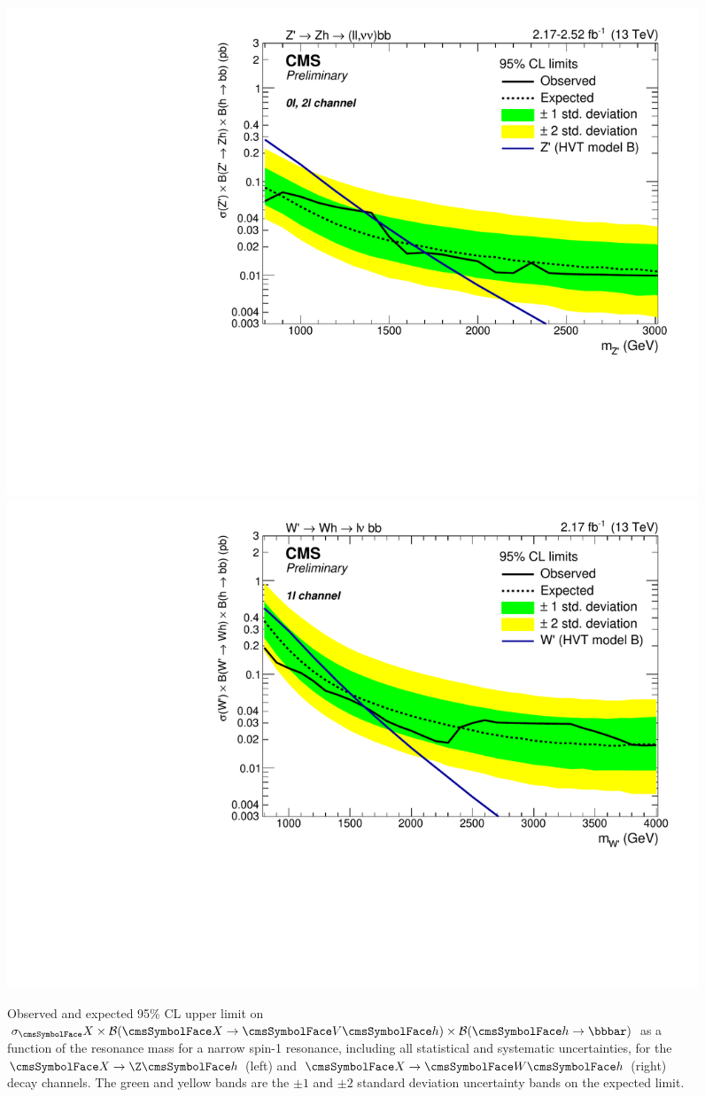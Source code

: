 \begin{figure}[!htb]\centering
    \includegraphics[width=\cmsFigWidth]{figures/Exclusion_XZh.pdf}
    \includegraphics[width=\cmsFigWidth]{figures/Exclusion_XWh.pdf}
    \caption{Observed and expected 95\% CL upper limit on $\sigma_\X \times \B(\X\to\VH) \times \B(\htobb)$ as a function of the resonance mass for a narrow spin-1 resonance, including all statistical and systematic uncertainties, for the $\X\to\Z\h$ (left) and $\X\to\PW\h$ (right) decay channels. The green and yellow bands are the ${\pm}1$ and ${\pm}2$ standard deviation uncertainty bands on the expected limit.}
  \label{fig:limit}
\end{figure}


